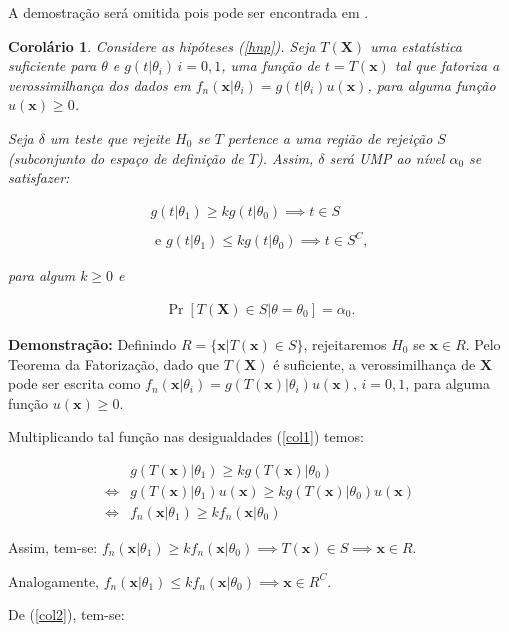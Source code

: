 \documentclass[a4paper,10pt, notitlepage]{report}
\newtheorem{col}{Corolário}
\newcommand{\pow}{^}%
\newcommand{\pr}{\operatorname{Pr}} %
\newcommand{\bX}{\boldsymbol{X}} %
\newcommand{\bx}{\boldsymbol{x}} %
\begin{document}
	A demostração será omitida pois pode ser encontrada em \citep{CaseBerg:01}.
	
	\begin{col}
		\label{colnp}
		Considere as hipóteses (\ref{hnp}). Seja $T(\bX)$ uma estatística suficiente para $\theta$ e $g(t|\theta_i)\,i=0,1$, uma função de $t=T(\bx)$ tal que fatoriza a verossimilhança dos dados em $f_n(\bx|\theta_i)=g(t|\theta_i)u(\bx)$, para alguma função $u(\bx)\geq0$.
		
		Seja $\delta$ um teste que rejeite $H_0$ se $T$ pertence a uma região de rejeição $S$ (subconjunto do espaço de definição de $T$). Assim, $\delta$ será UMP ao nível $\alpha_0$ se satisfazer:
		
		\begin{align}
		\label{col1}
		 g(t|\theta_1)\geq  kg(t|\theta_0)\implies t\in S\nonumber\\ \\\text{ e }g(t|\theta_1)\leq kg(t|\theta_0)\implies t\in S\pow C,\nonumber
		\end{align}
		
		para algum $k\geq0$ e 
		
		\begin{align}
		\label{col2}
		\pr[T(\bX)\in S|\theta = \theta_0]=\alpha_0.
		\end{align}
		
	\end{col}
	\textbf{Demonstração:} Definindo $R=\{\bx|T(\bx)\in S\}$, rejeitaremos $H_0$ se $\bx \in R$. Pelo Teorema da Fatorização, dado que $T(\bX)$ é suficiente, a verossimilhança de $\bX$ pode ser escrita como $f_n(\bx|\theta_i)=g(T(\bx)|\theta_i)u(\bx),\,i=0,1$, para alguma função $u(\bx)\geq 0$.
	
	Multiplicando tal função nas desigualdades (\ref{col1}) temos:
	
	\begin{align*}
		&g(T(\bx)|\theta_1)\geq kg(T(\bx)|\theta_0)\\
		\Leftrightarrow&
		g(T(\bx)|\theta_1)u(\bx)\geq kg(T(\bx)|\theta_0)u(\bx)\\
		\Leftrightarrow&f_n(\bx|\theta_1)\geq kf_n(\bx|\theta_0)
	\end{align*}
	
	Assim, tem-se: $f_n(\bx|\theta_1)\geq kf_n(\bx|\theta_0)\implies T(\bx)\in S\implies \bx \in R$.
	
	Analogamente, $f_n(\bx|\theta_1)\leq kf_n(\bx|\theta_0)\implies \bx \in R\pow C$.
	
	
	De (\ref{col2}), tem-se:
	
\end{document}
